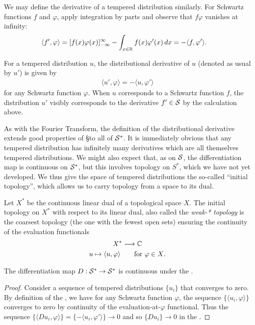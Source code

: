   We may define the derivative of a tempered distribution similarly.
  For Schwartz functions $f$ and $\varphi$, apply integration by parts and observe that $f\varphi$ vanishes at infinity:
  \begin{align*}
    \langle f', \varphi\rangle
    &= [f(x)\varphi(x)]_{-\infty}^\infty -\int_{x\in\R} f(x)\varphi'(x)\,dx
    = -\langle f,\varphi'\rangle\text{.}
  \end{align*}
  \begin{defn}
    For a tempered distribution $u$, the distributional derivative of $u$ (denoted as usual by $u'$) is given by
    \begin{align*}
      \langle u', \varphi\rangle = -\langle u, \varphi'\rangle
    \end{align*}
    for any Schwartz function $\varphi$.
    When $u$ corresponds to a Schwartz function $f$, the distribution $u'$ visibly corresponds to the derivative $f'\in\S$ by the calculation above. 
  \end{defn}
  
  As with the Fourier Transform, the definition of the distributional derivative extends good properties of \S to all of $\S^*$.
  It is immediately obvious that any tempered distribution has infinitely many derivatives which are all themselves tempered distributions.
  We might also expect that, as on $\S$, the differentiation map is continuous on $\S^*$, but this involves topology on $S^*$, which we have not yet developed.
  We thus give the space of tempered distributions the so-called ``initial topology'', which allows us to carry topology from a space to its dual.
  \begin{defn}
    Let $X^*$ be the continuous linear dual of a topological space $X$.
    The initial topology on $X^*$ with respect to its linear dual, also called the \emph{weak-* topology} is the coarsest topology (the one with the fewest open sets) ensuring the continuity of the evaluation functionals
    \begin{gather*}
      X^*\longrightarrow\C\\
      u\mapsto \langle u,\varphi\rangle\qquad\text{for }\varphi\in X\text{.}
    \end{gather*}
  \end{defn}

  \begin{claim}
    The differentiation map $D:\SS\rightarrow\SS$ is continuous under the \ws.
  \end{claim}
  \begin{proof}
    Consider a sequence of tempered distributions $\{u_i\}$ that converges to zero.
    By definition of the \ws, we have for any Schwartz function $\varphi$, the sequence $\{\langle u_i,\varphi\rangle\}$ converges to zero by continuity of the evaluation-at-$\varphi$ functional.
    Thus the sequence $ \{\langle Du_i, \varphi\rangle\} = \{-\langle u_i, \varphi'\rangle\} \rightarrow 0 $ and so $\{Du_i\}\rightarrow 0$ in the \ws.
  \end{proof}

